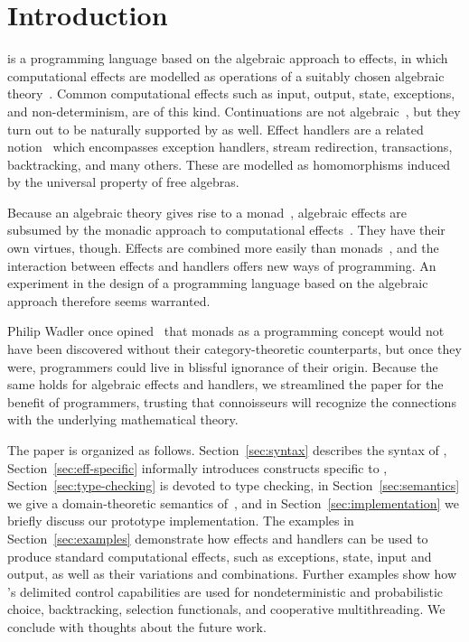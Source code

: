 \section*{Introduction}
\label{sec:introduction}

\Eff is a programming language based on the algebraic approach to effects, in
which computational effects are modelled as operations of a suitably chosen
algebraic theory~\cite{plotkin03algebraic}. Common computational effects such as
input, output, state, exceptions, and non-determinism, are of this kind.
Continuations are not algebraic~\cite{hyland07combining}, but they turn out to
be naturally supported by \eff as well. Effect handlers are a related
notion~\cite{plotkin09handlers,pretnar10:_logic_handl_algeb_effec} which
encompasses exception handlers, stream redirection, transactions, backtracking,
and many others. These are modelled as homomorphisms induced by the universal
property of free algebras.

Because an algebraic theory gives rise to a monad~\cite{plotkin02notions},
algebraic effects are subsumed by the monadic approach to computational
effects~\cite{benton00monads}. They have their own virtues, though. Effects are
combined more easily than monads~\cite{hyland06combining}, and the interaction
between effects and handlers offers new ways of programming. An experiment in
the design of a programming language based on the algebraic approach therefore
seems warranted.

Philip Wadler once opined~\cite{wadler95monads} that monads as a programming
concept would not have been discovered without their category-theoretic
counterparts, but once they were, programmers could live in blissful ignorance of
their origin. Because the same holds for algebraic effects and handlers, we
streamlined the paper for the benefit of programmers, trusting that connoisseurs
will recognize the connections with the underlying mathematical theory.

The paper is organized as follows. Section~\ref{sec:syntax} describes the syntax
of \eff, Section~\ref{sec:eff-specific} informally introduces constructs
specific to \eff, Section~\ref{sec:type-checking} is devoted to type checking,
in Section~\ref{sec:semantics} we give a domain-theoretic semantics of~\eff, and
in Section~\ref{sec:implementation} we briefly discuss our prototype
implementation. The examples in Section~\ref{sec:examples} demonstrate how
effects and handlers can be used to produce standard computational effects, such
as exceptions, state, input and output, as well as their variations and
combinations. Further examples show how \eff's delimited control capabilities
are used for nondeterministic and probabilistic choice, backtracking, selection
functionals, and cooperative multithreading. We conclude with thoughts about the
future work.

